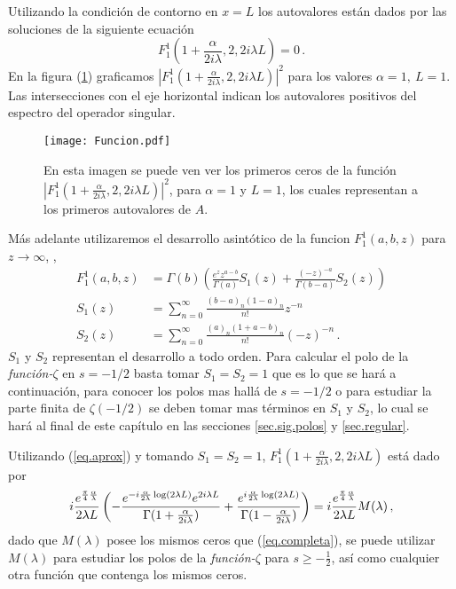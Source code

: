 Utilizando la condición de contorno en $x=L$ los autovalores están dados por las soluciones de la siguiente ecuación
\begin{equation}
F _1 ^1 \left( 1+\frac{ \alpha}{2 i \lambda},2,2 i \lambda L \right)  = 0
	\, .
\label{eq.1}
\end{equation}
En la figura (\ref{fig:funcion}) graficamos
\mbox{$ | F _1 ^1 (1+\frac{ \alpha}{2 i \lambda},2,2 i \lambda L) | ^2 $} para los valores  $\alpha=1, \ L=1$. Las intersecciones con el eje horizontal indican los autovalores positivos del espectro del operador singular.

\begin{figure}[h!]
\centering
\texttt{[image: Funcion.pdf]}
\caption{En esta imagen se puede ven ver los primeros ceros de la función $| F _1 ^1 (1+\frac{ \alpha}{2 i \lambda},2,2 i \lambda L) | ^2$, para $\alpha=1$ y $L=1$, los cuales representan a los primeros autovalores de $A$.}
\label{fig:funcion}
\end{figure}

Más adelante utilizaremos el desarrollo asintótico de la funcion $F _1 ^1 (a,b,z)$ para $z \rightarrow \infty$, \cite{Abramowitz:hyper},
\begin{equation}
\begin{aligned}
    F _1 ^1 (a,b,z) &= \Gamma (b) 
    \left(
    \frac{e^z z ^{a-b} }{\Gamma(a)}  S_1 (z) + \frac{(-z) ^{ -a}}{ \Gamma(b-a)} 
    S_2 (z)
    \right) \\[5pt]
    S _1 (z) &= \sum _{n=0} ^{\infty} \frac{(b-a) _n (1-a) _n}{n!} z ^{-n} \\[5pt]
    S _2 (z) &= \sum _{n=0} ^{\infty} \frac{(a) _n (1+a-b) _n}{n!} (-z) ^{-n}     
		\, .
\end{aligned}
\label{eq.aprox}
\end{equation}
$S_1$ y $S _2$ representan el desarrollo a todo orden. Para calcular el polo de la {\it función-$\zeta$} en $s=-1/2$ basta tomar $S _1 = S _2 = 1$ que es lo que se hará a continuación, para conocer los polos mas hallá de $s=-1/2$ o para estudiar la parte finita de $\zeta (-1/2)$ se deben tomar mas términos en $S_1$ y $S _2$, lo cual se hará al final de este capítulo en las secciones \ref{sec.sig.polos} y \ref{sec.regular}.


Utilizando (\ref{eq.aprox}) y tomando $S _1 = S _2 = 1$, $F _1 ^1 \left(1+  \frac{  \alpha}{2 i \lambda} ,2 ,2 i \lambda L  \right)$ está dado por
\begin{equation}
    i  \frac{e ^{ \frac{\pi}{4} \frac{\alpha}{\lambda} } }{2 \lambda L}
    \left( -
    \frac{e ^{- i \frac{\alpha}{2 \lambda}  \log (2 \lambda L) } e ^{2 i \lambda L} }{\Gamma(1+\frac{ \alpha}{2 i \lambda})} +
    \frac{e ^{  i \frac{\alpha}{2 \lambda}  \log (2 \lambda L) }}               {\Gamma(1-\frac{ \alpha}{2 i \lambda})}
    \right) \\[5pt]  
    =  i  \frac{e ^{ \frac{\pi}{4} \frac{\alpha}{\lambda} } }{2 \lambda L}     M (\lambda) 
    \, ,
\label{eq.completa}
\end{equation}
dado que $M( \lambda)$ posee los mismos ceros que (\ref{eq.completa}), se puede utilizar $M( \lambda)$  para estudiar los polos de la {\it función-$\zeta$} para $s \geq - \frac{1}{2}$, así  como cualquier otra función que contenga los mismos ceros.

